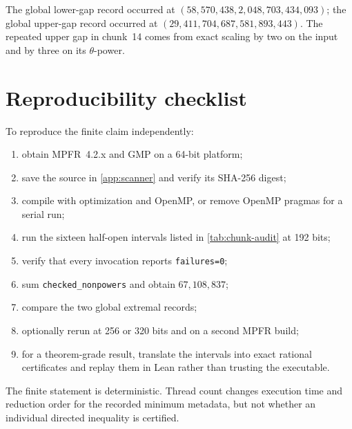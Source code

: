 \documentclass[11pt,oneside]{article}
\theoremstyle{definition}
\begin{document}
The global lower-gap record occurred at
\((58{,}570{,}438,2{,}048{,}703{,}434{,}093)\); the global upper-gap record occurred at
\((29{,}411{,}704,687{,}581{,}893{,}443)\).  The repeated upper gap in chunk~14 comes
from exact scaling by two on the input and by three on its \(\theta\)-power.

\section{Reproducibility checklist}\label{app:reproducibility}

To reproduce the finite claim independently:
\begin{enumerate}
\item obtain MPFR~4.2.x and GMP on a 64-bit platform;
\item save the source in \cref{app:scanner} and verify its SHA-256 digest;
\item compile with optimization and OpenMP, or remove OpenMP pragmas for a serial run;
\item run the sixteen half-open intervals listed in \cref{tab:chunk-audit} at 192 bits;
\item verify that every invocation reports \texttt{failures=0};
\item sum \texttt{checked\_nonpowers} and obtain \(67{,}108{,}837\);
\item compare the two global extremal records;
\item optionally rerun at 256 or 320 bits and on a second MPFR build;
\item for a theorem-grade result, translate the intervals into exact rational certificates
and replay them in Lean rather than trusting the executable.
\end{enumerate}

The finite statement is deterministic.  Thread count changes execution time and reduction
order for the recorded minimum metadata, but not whether an individual directed inequality
is certified.
\end{document}
